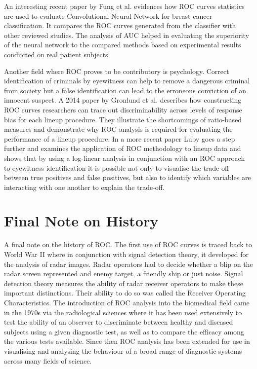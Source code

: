 An interesting recent paper by Fung et al. \citep{fung2018cnnbcancerclass} evidences how ROC curves statistics are used to evaluate Convolutional Neural Network for breast cancer classification. It compares the ROC curves generated from the classifier with other reviewed studies. The analysis of AUC helped in evaluating the superiority of the neural network to the compared methods based on experimental results conducted on real patient subjects.

Another field where ROC proves to be contributory is psychology. Correct identification of criminals by eyewitness can help to remove a dangerous criminal from society but a false identification can lead to the erroneous conviction of an innocent suspect. A 2014 paper by Gronlund et al. \citep{gronlund2014eyewitness} describes how constructing ROC curves researchers can trace out discriminability across levels of response bias for each lineup procedure. They illustrate the shortcomings of ratio-based measures and demonstrate why ROC analysis is required for evaluating the performance of a lineup procedure. In a more recent paper Luby \citep{luby2017lineup} goes a step further and examines the application of ROC methodology to lineup data and shows that by using a log-linear analysis in conjunction with an ROC approach to eyewitness identification it is possible not only to visualise the trade-off between true positives and false positives, but also to identify which variables are interacting with one another to explain the trade-off.

\section{Final Note on History}
A final note on the history of ROC. The first use of ROC curves is traced back to World War II where in conjunction with signal detection theory, it developed for the analysis of radar images. Radar operators had to decide whether a blip on the radar screen represented and enemy target, a friendly ship or just noise. Signal detection theory measures the ability of radar receiver operators to make these important distinctions. Their ability to do so was called the Receiver Operating Characteristics. The introduction of ROC analysis into the biomedical field came in the 1970s via the radiological sciences where it has been used extensively to test the ability of an observer to discriminate between healthy and diseased subjects using a given diagnostic test, as well as to compare the efficacy among the various tests available. Since then ROC analysis has been extended for use in visualising and analysing the behaviour of a broad range of diagnostic systems across many fields of science. 

